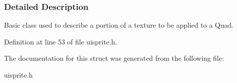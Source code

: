 \subsubsection{Detailed Description}
Basic class used to describe a portion of a texture to be applied to a Quad. 

Definition at line 53 of file uisprite.h.



The documentation for this struct was generated from the following file:\begin{DoxyCompactItemize}
\item 
uisprite.h\end{DoxyCompactItemize}

